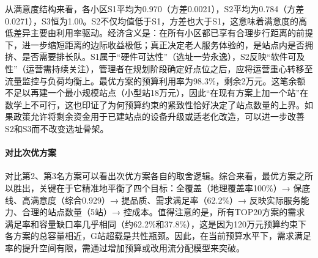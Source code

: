 \documentclass[UTF8]{ctexart}
\begin{document}
从满意度结构来看，各小区S1平均为0.970（方差0.0021），S2平均为0.784（方差0.0271），S3恒为1.00。S2不仅均值低于S1，方差也大于S1，这意味着满意度的高低差异主要由利用率驱动。经济含义是：在所有小区都已享有合理步行距离的前提下，进一步缩短距离的边际收益极低；真正决定老人服务体验的，是站点内是否拥挤、是否需要排长队。S1属于“硬件可达性”（选址一劳永逸），S2反映“软件可及性”（运营需持续关注），管理者在规划阶段确定好点位之后，应将运营重心转移至流量监控与负荷均衡上。最优方案的预算利用率为98.3\%，剩余2万元。这笔余额不足以再建一个最小规模站点（小型站18万元），因此“在现有方案上加一个站”在数学上不可行，这也印证了为何预算约束的紧致性恰好决定了站点数量的上界。如果政策允许将剩余资金用于已建站点的设备升级或适老化改造，可以进一步改善S2和S3而不改变选址骨架。

\paragraph{对比次优方案}

\begin{table}[H]
\centering
\caption{次优方案对比}
\renewcommand{\arraystretch}{1.3}
\end{table}

对比第2、第3名方案可以看出次优方案各自的取舍逻辑。综合来看，最优方案之所以胜出，关键在于它精准地平衡了四个目标：全覆盖（地理覆盖率100\%）→ 保底线、高满意度（综合0.929）→ 提品质、需求满足率（62.2\%）→ 反映实际服务能力、合理的站点数量（5站）→ 控成本。值得注意的是，所有TOP20方案的需求满足率和容量缺口率几乎相同（约62.2\%和37.8\%），这是因为120万元预算约束下各方案的总容量相近，G站超载是共性瓶颈。因此，在当前预算水平下，需求满足率的提升空间有限，需通过增加预算或改用流分配模型来突破。
\end{document}
